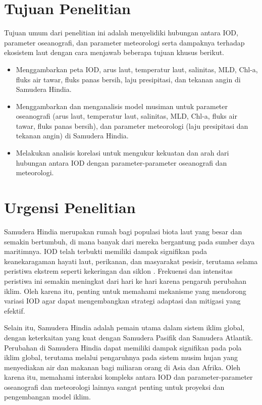 \begin{spacing}{1.5}
	\section[Tujuan Penelitian]{Tujuan Penelitian}
	
	Tujuan umum dari penelitian ini adalah menyelidiki hubungan antara IOD, parameter oseanografi, dan parameter meteorologi serta dampaknya terhadap ekosistem laut dengan cara menjawab beberapa tujuan khusus berikut.
	
	\begin{itemize}
		\item Menggambarkan peta IOD, arus laut, temperatur laut, salinitas, MLD, Chl-a, fluks air tawar, fluks panas bersih, laju presipitasi, dan tekanan angin di Samudera Hindia.
		\item Menggambarkan dan menganalisis model musiman untuk parameter oseanografi (arus laut, temperatur laut, salinitas, MLD, Chl-a, fluks air tawar, fluks panas bersih), dan parameter meteorologi (laju presipitasi dan tekanan angin) di Samudera Hindia.
		\item Melakukan analisis korelasi untuk mengukur kekuatan dan arah dari hubungan antara IOD dengan parameter-parameter oseanografi dan meteorologi.
	\end{itemize}
	\section[Urgensi Penelitian]{Urgensi Penelitian}

	Samudera Hindia merupakan rumah bagi populasi biota laut yang besar dan semakin bertumbuh, di mana banyak dari mereka bergantung pada sumber daya maritimnya. IOD telah terbukti memiliki dampak signifikan pada keanekaragaman hayati laut, perikanan, dan masyarakat pesisir, terutama selama peristiwa ekstrem seperti kekeringan \cite{Pan2018} dan siklon \cite{Wahiduzzaman2022}. Frekuensi dan intensitas peristiwa ini semakin meningkat dari hari ke hari karena pengaruh perubahan iklim. Oleh karena itu, penting untuk memahami mekanisme yang mendorong variasi IOD agar dapat mengembangkan strategi adaptasi dan mitigasi yang efektif.
	
	Selain itu, Samudera Hindia adalah pemain utama dalam sistem iklim global, dengan keterkaitan yang kuat dengan Samudera Pasifik dan Samudera Atlantik. Perubahan di Samudera Hindia dapat memiliki dampak signifikan pada pola iklim global, terutama melalui pengaruhnya pada sistem musim hujan yang menyediakan air dan makanan bagi miliaran orang di Asia dan Afrika. Oleh karena itu, memahami interaksi kompleks antara IOD dan parameter-parameter oseanografi dan meteorologi lainnya sangat penting untuk proyeksi dan pengembangan model iklim.
	

\end{spacing}

